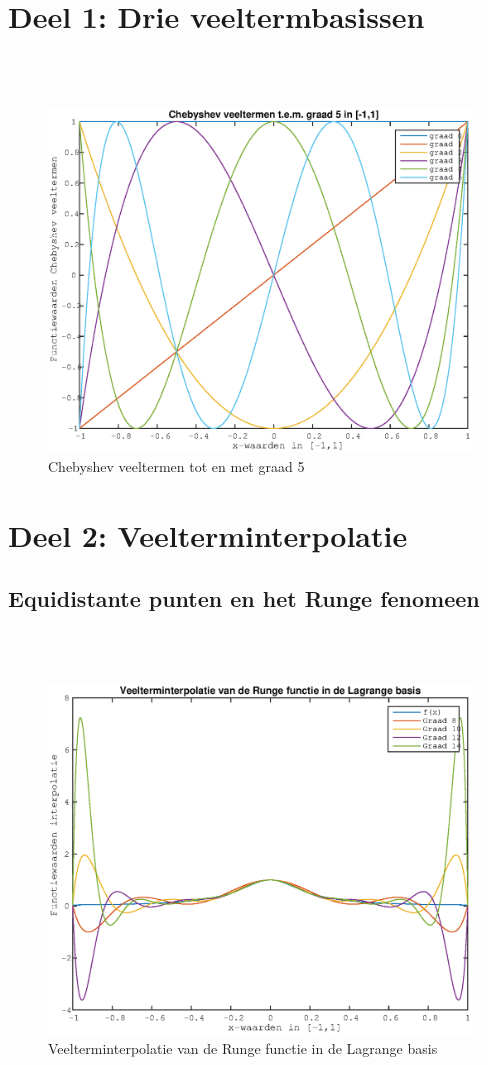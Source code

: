 \documentclass{article}
\begin{document}

\section{Deel 1: Drie veeltermbasissen} 

 \\  \ \\
\begin{figure}[H]
\includegraphics[width=0.50\columnwidth]{chebyshev_veeltermen}
\caption{Chebyshev veeltermen tot en met graad 5} %
\end{figure}




\section{Deel 2: Veelterminterpolatie}


\subsection{Equidistante punten en het Runge fenomeen}
 \\  \ \\

\begin{figure}[H]
\includegraphics[width=0.60\columnwidth]{lagrange_interpolatie}
\caption{Veelterminterpolatie van de Runge functie in de Lagrange basis} %
\end{figure}
\end{document}
